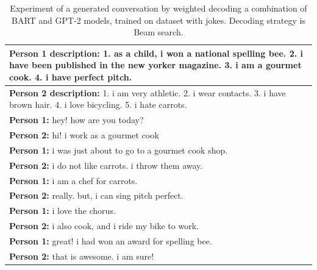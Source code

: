 \begin{table}[H]
\centering
 \begin{tabular}{|p{14cm}|} 
 \hline
 \textbf{Person 1 description:} 1. as a child, i won a national spelling bee. 2. i have been published in the new yorker magazine. 3. i am a gourmet cook. 4. i have perfect pitch. \\
 \hline
 \textbf{Person 2 description:} 1. i am very athletic. 2. i wear contacts. 3. i have brown hair. 4. i love bicycling. 5. i hate carrots. \\
 \hline
 \textbf{Person 1:} hey! how are you today? \\ 
 \textbf{Person 2:} hi! i work as a gourmet cook \\
 \textbf{Person 1:} i was just about to go to a gourmet cook shop. \\
 \textbf{Person 2:} i do not like carrots. i throw them away. \\
 \textbf{Person 1:} i am a chef for carrots.\\
 \textbf{Person 2:} really. but, i can sing pitch perfect. \\
 \textbf{Person 1:} i love the chorus. \\
 \textbf{Person 2:} i also cook, and i ride my bike to work. \\
 \textbf{Person 1:} great! i had won an award for spelling bee.\\
 \textbf{Person 2:} that is awesome. i am sure! \\
 \hline
 \end{tabular}
 \caption{Experiment of a generated conversation by weighted decoding a combination of BART and GPT-2 models, trained on dataset with jokes. Decoding strategy is Beam search.}
\label{tab:combo_bart_gpt2_jokes}
\end{table}


